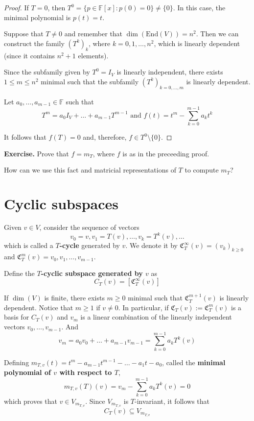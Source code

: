 \begin{proof}
	If $T = 0$, then $T^0 = \{ p \in \mathbb{F}[x] : p(0) = 0 \} \neq \{ 0 \}$. In this case, the minimal polynomial is $p(t) = t$.
	
	Suppose that $T \neq 0$ and remember that $\dim(\text{End}(V)) = n^2$. Then we can construct the family $(T^k)_k$, where $k = 0, 1, \ldots, n^2$, which is linearly dependent (since it contains $n^2 + 1$ elements).
	
	Since the subfamily given by $T^0 = I_V$ is linearly independent, there exists $1 \leq m \leq n^2$ minimal such that the subfamily $(T^k)_{k=0, \ldots, m}$ is linearly dependent.
	
	Let $a_0, \ldots, a_{m-1} \in \mathbb{F}$ such that
	\[
		T^m = a_0 I_V + \ldots + a_{m-1} T^{m-1} \text{ and } f(t) = t^m - \sum_{k=0}^{m-1} a_k t^k
	\]
	
	It follows that $f(T) = 0$ and, therefore, $f \in T^0 \setminus \{ 0 \}$.
\end{proof}

\textbf{Exercise.} Prove that $f = m_T$, where $f$ is as in the preceeding proof.

How can we use this fact and matricial representations of $T$ to compute $m_T$?

\section{Cyclic subspaces}

Given $v \in V$, consider the sequence of vectors
\[
	v_0 = v, v_1 = T(v), \ldots, v_k = T^k(v), \ldots
\]
which is called a \textbf{$T$-cycle} generated by $v$. We denote it by $\mathfrak{C}_T^\infty (v) = (v_k)_{k \geq 0}$ and $\mathfrak{C}_T^m (v) = v_0, v_1, \ldots, v_{m-1}$.

Define the \textbf{$T$-cyclic subspace generated by $v$} as
\[
	C_T(v) = [\mathfrak{C}_T^\infty (v)]
\]

If $\dim(V)$ is finite, there exists $m \geq 0$ minimal such that $\mathfrak{C}_T^{m+1}(v)$ is linearly dependent. Notice that $m \geq 1$ if $v \neq 0$. In particular, if $\mathfrak{C}_T(v) := \mathfrak{C}_T^{m}(v)$ is a basis for $C_T(v)$ and $v_m$ is a linear combination of the linearly independent vectors $v_0, \ldots, v_{m-1}$. And
\[
	v_m = a_0 v_0 + \ldots + a_{m-1} v_{m-1} = \sum_{k=0}^{m-1} a_k T^k(v)
\]

Defining $m_{T,v}(t) = t^m - a_{m-1}t^{m-1} - \ldots - a_1t - a_0$, called the \textbf{minimal polynomial of $v$ with respect to $T$}, 
\[
	m_{T, v}(T)(v) = v_m - \sum_{k=0}^{m-1} a_k T^k(v) = 0
\]
which proves that $v \in V_{m_{T,v}}$. Since $V_{m_{T,v}}$ is $T$-invariant, it follows that
\[
	C_T(v) \subseteq V_{m_{T,v}}
\]

